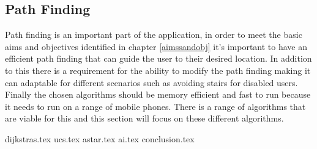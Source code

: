 \subsection{Path Finding}
Path finding is an important part of the application, in order to meet the basic aims and objectives identified in chapter \ref{aimssandobj} it's important to have an efficient path finding that can guide the user to their desired location. In addition to this there is a requirement for the ability to modify the path finding making it can adaptable for different scenarios such as avoiding stairs for disabled users. Finally the chosen algorithms should be memory efficient and fast to run because it needs to run on a range of mobile phones. There is a range of algorithms that are viable for this and this section will focus on these different algorithms.

{dijkstras.tex}
{ucs.tex}
{astar.tex}
{ai.tex}
{conclusion.tex}